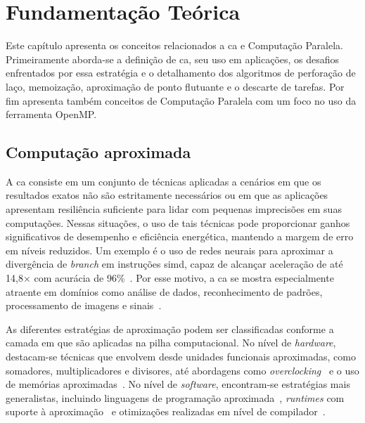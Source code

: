 \chapter{Fundamentaç\~ao Te\'orica}\label{cap:fundamentacaoTeorica}

Este capítulo apresenta os conceitos relacionados a \gls{ca} e Computação Paralela. Primeiramente aborda-se a definição de \gls{ca}, seu uso em aplicações, os desafios enfrentados por essa estratégia e o detalhamento dos algoritmos de perforação de laço, memoização, aproximação de ponto flutuante e o descarte de tarefas. Por fim apresenta também conceitos de Computação Paralela com um foco no uso da ferramenta OpenMP.

\section{Computação aproximada}\label{sec:compAprox}

A \gls{ca} consiste em um conjunto de técnicas aplicadas a cenários em que os resultados exatos não são estritamente necessários ou em que as aplicações apresentam resiliência suficiente para lidar com pequenas imprecisões em suas computações. Nessas situações, o uso de tais técnicas pode proporcionar ganhos significativos de desempenho e eficiência energética, mantendo a margem de erro em níveis reduzidos. Um exemplo é o uso de redes neurais para aproximar a divergência de \textit{branch} em instruções \gls{simd}, capaz de alcançar aceleração de até 14,8$\times$ com acurácia de 96\%~\cite{grigorian2015}. Por esse motivo, a \gls{ca} se mostra especialmente atraente em domínios como análise de dados, reconhecimento de padrões, processamento de imagens e sinais~\cite{mittal2016, chippa2013}.

As diferentes estratégias de aproximação podem ser classificadas conforme a camada em que são aplicadas na pilha computacional. No nível de \textit{hardware}, destacam-se técnicas que envolvem desde unidades funcionais aproximadas, como somadores, multiplicadores e divisores, até abordagens como \textit{overclocking}~\cite{leon2025a,leon2025b} e o uso de memórias aproximadas~\cite{fabricio2020}. No nível de \textit{software}, encontram-se estratégias mais generalistas, incluindo linguagens de programação aproximada~\cite{sampson2015}, \textit{runtimes} com suporte à aproximação~\cite{li2018,reis2024} e otimizações realizadas em nível de compilador~\cite{oliveira2024a,oliveira2024b}.

